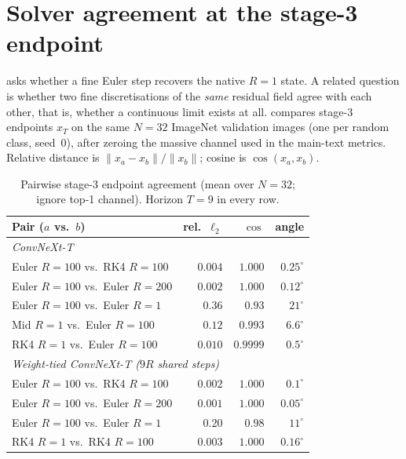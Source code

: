 \section{Solver agreement at the stage-3 endpoint}
\label{app:solver-endpoints}

 asks whether a fine Euler step recovers the native
$R{=}1$ state.
A related question is whether two fine discretisations of the \emph{same} residual
field agree with each other, that is, whether a continuous limit exists at all.
 compares stage-3 endpoints $x_T$ on the same
$N{=}32$ ImageNet validation images (one per random class, seed~$0$), after zeroing
the massive channel used in the main-text metrics.
Relative distance is $\|x_a-x_b\|/\|x_b\|$; cosine is $\cos(x_a,x_b)$.

\begin{table}[t]
    \centering
    \caption{Pairwise stage-3 endpoint agreement (mean over $N{=}32$; ignore top-1
    channel). Horizon $T{=}9$ in every row.}
    \label{tab:app-solver-endpoints}
    \small
    \setlength{\tabcolsep}{3pt}
    \begin{tabular}{lrrr}
        \toprule
        Pair ($a$ vs.\ $b$) & rel.\ $\ell_2$ & $\cos$ & angle \\
        \midrule
        \multicolumn{4}{l}{\emph{ConvNeXt-T}} \\
        Euler $R{=}100$ vs.\ RK4 $R{=}100$ & $0.004$ & $1.000$ & $0.25^\circ$ \\
        Euler $R{=}100$ vs.\ Euler $R{=}200$ & $0.002$ & $1.000$ & $0.12^\circ$ \\
        Euler $R{=}100$ vs.\ Euler $R{=}1$ & $0.36$ & $0.93$ & $21^\circ$ \\
        Mid $R{=}1$ vs.\ Euler $R{=}100$ & $0.12$ & $0.993$ & $6.6^\circ$ \\
        RK4 $R{=}1$ vs.\ Euler $R{=}100$ & $0.010$ & $0.9999$ & $0.5^\circ$ \\
        \midrule
        \multicolumn{4}{l}{\emph{Weight-tied ConvNeXt-T ($9R$ shared steps)}} \\
        Euler $R{=}100$ vs.\ RK4 $R{=}100$ & $0.002$ & $1.000$ & $0.1^\circ$ \\
        Euler $R{=}100$ vs.\ Euler $R{=}200$ & $0.001$ & $1.000$ & $0.05^\circ$ \\
        Euler $R{=}100$ vs.\ Euler $R{=}1$ & $0.20$ & $0.98$ & $11^\circ$ \\
        RK4 $R{=}1$ vs.\ RK4 $R{=}100$ & $0.003$ & $1.000$ & $0.16^\circ$ \\
        \bottomrule
    \end{tabular}
\end{table}

